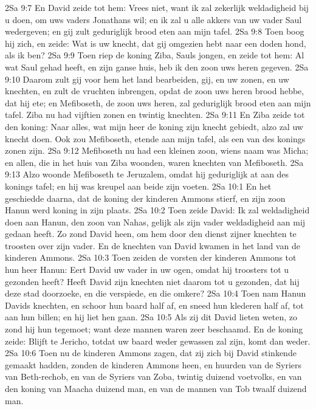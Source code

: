 2Sa 9:7  En David zeide tot hem: Vrees niet, want ik zal zekerlijk weldadigheid bij u doen, om uws vaders Jonathans wil; en ik zal u alle akkers van uw vader Saul wedergeven; en gij zult geduriglijk brood eten aan mijn tafel.
2Sa 9:8  Toen boog hij zich, en zeide: Wat is uw knecht, dat gij omgezien hebt naar een doden hond, als ik ben?
2Sa 9:9  Toen riep de koning Ziba, Sauls jongen, en zeide tot hem: Al wat Saul gehad heeft, en zijn ganse huis, heb ik den zoon uws heren gegeven.
2Sa 9:10  Daarom zult gij voor hem het land bearbeiden, gij, en uw zonen, en uw knechten, en zult de vruchten inbrengen, opdat de zoon uws heren brood hebbe, dat hij ete; en Mefiboseth, de zoon uws heren, zal geduriglijk brood eten aan mijn tafel. Ziba nu had vijftien zonen en twintig knechten.
2Sa 9:11  En Ziba zeide tot den koning: Naar alles, wat mijn heer de koning zijn knecht gebiedt, alzo zal uw knecht doen. Ook zou Mefiboseth, etende aan mijn tafel, als een van des konings zonen zijn.
2Sa 9:12  Mefiboseth nu had een kleinen zoon, wiens naam was Micha; en allen, die in het huis van Ziba woonden, waren knechten van Mefiboseth.
2Sa 9:13  Alzo woonde Mefiboseth te Jeruzalem, omdat hij geduriglijk at aan des konings tafel; en hij was kreupel aan beide zijn voeten.
2Sa 10:1  En het geschiedde daarna, dat de koning der kinderen Ammons stierf, en zijn zoon Hanun werd koning in zijn plaats.
2Sa 10:2  Toen zeide David: Ik zal weldadigheid doen aan Hanun, den zoon van Nahas, gelijk als zijn vader weldadigheid aan mij gedaan heeft. Zo zond David heen, om hem door den dienst zijner knechten te troosten over zijn vader. En de knechten van David kwamen in het land van de kinderen Ammons.
2Sa 10:3  Toen zeiden de vorsten der kinderen Ammons tot hun heer Hanun: Eert David uw vader in uw ogen, omdat hij troosters tot u gezonden heeft? Heeft David zijn knechten niet daarom tot u gezonden, dat hij deze stad doorzoeke, en die verspiede, en die omkere?
2Sa 10:4  Toen nam Hanun Davids knechten, en schoor hun baard half af, en sneed hun klederen half af, tot aan hun billen; en hij liet hen gaan.
2Sa 10:5  Als zij dit David lieten weten, zo zond hij hun tegemoet; want deze mannen waren zeer beschaamd. En de koning zeide: Blijft te Jericho, totdat uw baard weder gewassen zal zijn, komt dan weder.
2Sa 10:6  Toen nu de kinderen Ammons zagen, dat zij zich bij David stinkende gemaakt hadden, zonden de kinderen Ammons heen, en huurden van de Syriers van Beth-rechob, en van de Syriers van Zoba, twintig duizend voetvolks, en van den koning van Maacha duizend man, en van de mannen van Tob twaalf duizend man.
